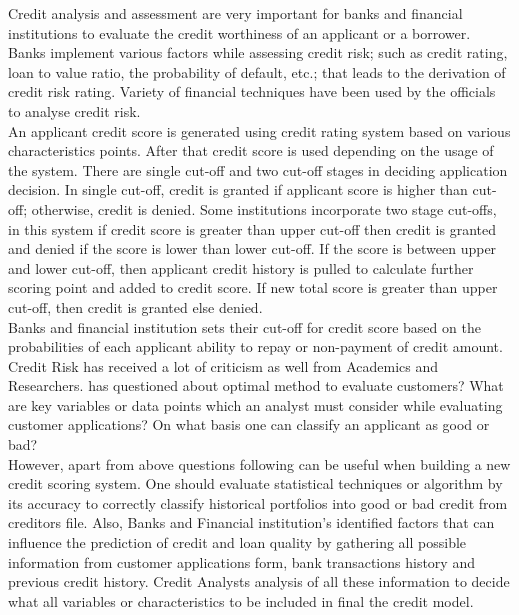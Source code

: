 {Credit analysis and assessment are very important for banks and financial institutions to evaluate the credit worthiness of an applicant or a borrower. Banks implement various factors while assessing credit risk; such as credit rating, loan to value ratio, the probability of default, etc.; that leads to the derivation of credit risk rating. Variety of financial techniques have been used by the officials to analyse credit risk.\\

An applicant credit score is generated using credit rating system based on various characteristics points. After that credit score is used depending on the usage of the system. There are single cut-off and two cut-off stages in deciding application decision. In single cut-off, credit is granted if applicant score is higher than cut-off; otherwise, credit is denied. Some institutions incorporate two stage cut-offs, in this system if credit score is greater than upper cut-off then credit is granted and denied if the score is lower than lower cut-off. If the score is between upper and lower cut-off, then applicant credit history is pulled to calculate further scoring point and added to credit score. If new total score is greater than upper cut-off, then credit is granted else denied.\\

Banks and financial institution sets their cut-off for credit score based on the probabilities of each applicant ability to repay or non-payment of credit amount. Credit Risk has received a lot of criticism as well from Academics and Researchers. \citet{al2002credit} has questioned about optimal method to evaluate customers? What are key variables or data points which an analyst must consider while evaluating customer applications? On what basis one can classify an applicant as good or bad?\\

However, apart from above questions following can be useful when building a new credit scoring system. One should evaluate statistical techniques or algorithm by its accuracy to correctly classify historical portfolios into good or bad credit from creditors file. Also, Banks and Financial institution's identified factors that can influence the prediction of credit and loan quality by gathering all possible information from customer applications form, bank transactions history and previous credit history. Credit Analysts analysis of all these information to decide what all variables or characteristics to be included in final the credit model.\\

}

